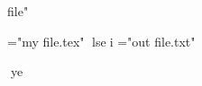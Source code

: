 file"

="my file.tex"  lsei
\immediate{}="out file.txt" \immediate{}\immediate{}
\message{\jobname}ye
